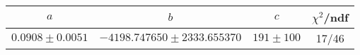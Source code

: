 \begin{tabular}{c|c|c|c}
$a$ & $b$ & $c$ & $\chi^2$/ndf \\
\hline
$0.0908\pm0.0051$ & $-4198.747650\pm2333.655370$ & $191\pm100$ & 17/46
\end{tabular}
